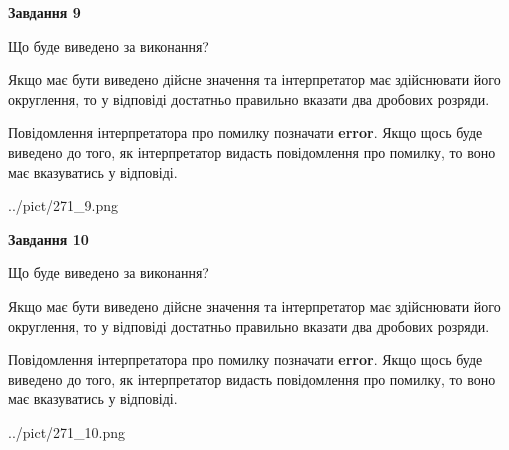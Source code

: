 \documentclass[12pt, ukrainian]{article}
\begin{document}
{\begin {Large}
{\begin {center}\textbf{Завдання 9}\end {center}}\par
Що буде виведено за виконання? \par

Якщо має бути виведено дійсне значення та інтерпретатор має здійснювати його округлення, 
то у відповіді достатньо правильно вказати два дробових розряди.

Повідомлення інтерпретатора про помилку позначати \textbf{error}.
Якщо щось буде виведено до того, як інтерпретатор видасть повідомлення про помилку, 
то воно має вказуватись у відповіді. \par

\begin{center}
	{../pict/271_9.png}
\end{center}
\newpage

{\begin {center}\textbf{Завдання 10}\end {center}}\par
Що буде виведено за виконання? \par

Якщо має бути виведено дійсне значення та інтерпретатор має здійснювати його округлення, 
то у відповіді достатньо правильно вказати два дробових розряди.

Повідомлення інтерпретатора про помилку позначати \textbf{error}.
Якщо щось буде виведено до того, як інтерпретатор видасть повідомлення про помилку, 
то воно має вказуватись у відповіді. \par

\begin{center}
	{../pict/271_10.png}
\end{center}
\newpage

\end {Large}}
\end{document}
